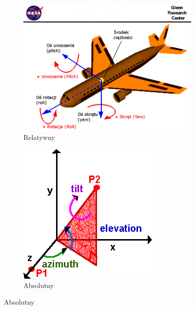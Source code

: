 \begin{savenotes}
	\begin{figure}[!htb]
		\captionsetup{singlelinecheck=off}
		\centering
		\begin{subfigure}[b]{0.45\textwidth}
			\centering
			\includegraphics[width=\linewidth]{images/nasaAircraft.png}	
			\caption[Kąty Eulera w relatywnym układzie współrzędnych]{Relatywny }
			\label{fig:appx:rot:eulerRel}
		\end{subfigure}
																																		
		\begin{subfigure}[b]{0.45\textwidth}
			\centering
			\includegraphics[width=\linewidth]{images/eulerAbsolute.png}		
			\caption[Kąty Eulera w absolutnym układzie współrzędnych]{Absolutny }
			\label{fig:appx:rot:eulerAbs}
		\end{subfigure}
																																	

\end{figure}
\end{savenotes}
